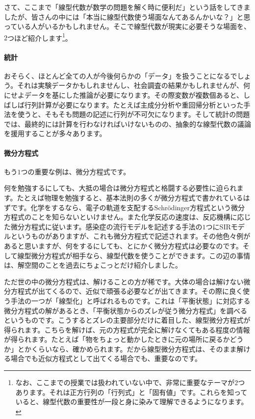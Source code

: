 さて、ここまで「線型代数が数学の問題を解く時に便利だ」という話をしてきましたが、皆さんの中には「本当に線型代数使う場面なんてあるんかいな？」と思っている人がいるかもしれません。そこで線型代数が現実に必要そうな場面を、$2$つほど紹介します\footnote{なお、ここまでの授業では扱われていない中で、非常に重要なテーマが$2$つあります。それは正方行列の「行列式」と「固有値」です。これらを知っていると、線型代数の重要性が一段と身に染みて理解できるようになります。}。

\paragraph{統計}

おそらく、ほとんど全ての人が今後何らかの「データ」を扱うことになるでしょう。それは実験データかもしれませんし、社会調査の結果かもしれませんが、何にせよデータを基にした推論が必要になります。その際変数が複数個あると、しばしば行列計算が必要になります。たとえば主成分分析や重回帰分析といった手法を使うと、そもそも問題の記述に行列が不可欠になります。そして統計の問題では、最終的には計算を行わなければいけないものの、抽象的な線型代数の議論を援用することが多々あります。

\paragraph{微分方程式}

もう$1$つの重要な例は、微分方程式です。

何を勉強するにしても、大抵の場合は微分方程式と格闘する必要性に迫られます。たとえば物理を勉強すると、基本法則の多くが微分方程式で書かれているはずです。化学をするなら、電子の軌道を支配するSchr\"odinger方程式という微分方程式のことを知らないといけません。また化学反応の速度は、反応機構に応じた微分方程式に従います。感染症の流行モデルを記述する手法の$1$つにSIRモデルというものがありますが、これも微分方程式で記述されます。その他色々例があると思いますが、何をするにしても、とにかく微分方程式は必要なのです。そして線型微分方程式が相手なら、線型代数を使うことができます。この辺の事情は、解空間のことを過去にちょこっとだけ紹介しました。

ただ世の中の微分方程式は、解けることの方が稀です。大体の場合は解けない微分方程式が出てくるので、近似で頑張る必要などが出てきます。その際に良く使う手法の一つが「線型化」と呼ばれるものです。これは「平衡状態」に対応する微分方程式の解があるとき、「平衡状態からのズレが従う微分方程式」を調べるというものです。こうするとズレの主要部分だけに着目した、線型微分方程式が得られます。こちらを解けば、元の方程式が完全に解けなくてもある程度の情報が得られます。たとえば「物をちょっと動かしたときに元の場所に戻るかどうか」とかくらいなら、確かめられます。だから線型微分方程式は、そのまま解ける場合でも近似方程式として出てくる場合でも、重要なのです。

